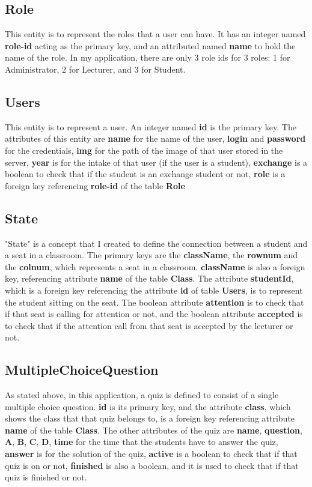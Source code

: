 \documentclass[a4paper, 11pt,openany]{book} %
\begin{document}
\subsection{Role}
This entity is to represent the roles that a user can have. It has an integer named \textbf{role-id} acting as the primary key, and an attributed named \textbf{name} to hold the name of the role. In my application, there are only 3 role ids for 3 roles: 1 for Administrator, 2 for Lecturer, and 3 for Student.

\subsection{Users}
This entity is to represent a user. An integer named \textbf{id} is the primary key. The attributes of this entity are \textbf{name} for the name of the user, \textbf{login} and \textbf{password} for the credentials, \textbf{img} for the path of the image of that user stored in the server, \textbf{year} is for the intake of that user (if the user is a student), \textbf{exchange} is a boolean to check that if the student is an exchange student or not, \textbf{role} is a foreign key referencing \textbf{role-id} of the table \textbf{Role}  

\subsection{State}
"State" is a concept that I created to define the connection between a student and a seat in a classroom. The primary keys are the \textbf{className}, the \textbf{rownum} and the \textbf{colnum}, which represents a seat in a classroom. \textbf{className} is also a foreign key, referencing attribute \textbf{name} of the table \textbf{Class}. The attribute \textbf{studentId}, which is a foreign key referencing the attribute \textbf{id} of table \textbf{Users}, is to represent the student sitting on the seat. The boolean attribute \textbf{attention} is to check that if that seat is calling for attention or not, and the boolean attribute \textbf{accepted} is to check that if the attention call from that seat is accepted by the lecturer or not.

\subsection{MultipleChoiceQuestion}
As stated above, in this application, a quiz is defined to consist of a single multiple choice question. \textbf{id} is its primary key, and the attribute \textbf{class}, which shows the class that that quiz belongs to, is a foreign key referencing attribute \textbf{name} of the table \textbf{Class}. The other attributes of the quiz are \textbf{name}, \textbf{question}, \textbf{A}, \textbf{B}, \textbf{C}, \textbf{D}, \textbf{time} for the time that the students have to answer the quiz, \textbf{answer} is for the solution of the quiz, \textbf{active} is a boolean to check that if that quiz is on or not, \textbf{finished} is also a boolean, and it is used to check that if that quiz is finished or not.
\end{document}
